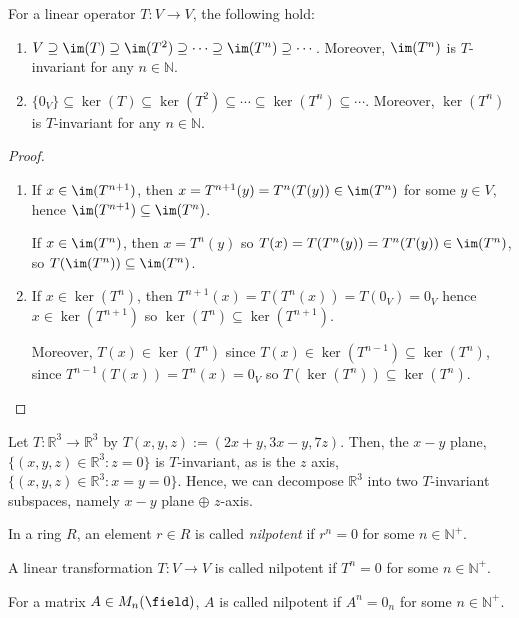 \begin{proposition}
    For a linear operator $T : V \to V$, the following hold:
    \begin{enumerate}
        \item $V \supseteq \im(T) \supseteq \im(T^2) \supseteq \cdots \supseteq \im(T^n) \supseteq  \cdots$. Moreover, $\im(T^n)$ is $T$-invariant for any $n \in \mathbb{N}$.
        \item $\{0_V\} \subseteq \ker(T) \subseteq \ker(T^2) \subseteq \cdots \subseteq \ker(T^n) \subseteq \cdots$. Moreover, $\ker(T^n)$ is $T$-invariant for any $n \in \mathbb{N}$.
    \end{enumerate}
\end{proposition}

\begin{proof}
    \begin{enumerate}
        \item If $x \in \im(T^{n+1})$, then $x = T^{n+1}(y) = T^{n}(T(y)) \in \im(T^n)$ for some $y \in V$, hence $\im(T^{n+1}) \subseteq \im(T^{n})$.
        
         If $x \in \im(T^n)$, then $x = T^{n}(y)$ so $T(x) = T(T^{n}(y)) = T^{n}(T(y)) \in \im (T^n)$, so $T(\im(T^n)) \subseteq \im(T^n)$.

         \item If $x \in \ker(T^n)$, then $T^{n+1}(x) = T(T^n(x)) = T(0_V) = 0_V$ hence $x \in \ker(T^{n+1})$ so $\ker(T^{n}) \subseteq \ker(T^{n+1})$.
         
         Moreover, $T(x) \in \ker(T^n)$ since $T(x) \in \ker (T^{n-1}) \subseteq \ker(T^n)$, since $T^{n-1}(T(x)) = T^{n}(x) = 0_V$ so $T(\ker(T^n)) \subseteq \ker(T^{n})$.
    \end{enumerate}
\end{proof}

\begin{example}
    Let $T: \mathbb{R}^3 \to \mathbb{R}^3$ by $T(x, y, z) := (2x +y, 3x - y, 7z)$. Then, the $x-y$ plane, $\{(x, y, z) \in \mathbb{R}^3: z = 0\}$ is $T$-invariant, as is the $z$ axis, $\{(x, y, z)\in\mathbb{R}^3: x = y = 0\}$. Hence, we can decompose $\mathbb{R}^3$ into two $T$-invariant subspaces, namely $x-y$ plane $\oplus$ $z$-axis.
\end{example}

\begin{definition}[Nilpotent]
    In a ring $R$, an element $r \in R$ is called \emph{nilpotent} if $r^n = 0$ for some $n \in \mathbb{N}^+$. 
    
    A linear transformation $T: V \to V$ is called nilpotent if $T^n = 0$ for some $n \in \mathbb{N}^+$.\footnotemark

    For a matrix $A \in M_n(\field)$, $A$ is called nilpotent if $A^n = 0_n$ for some $n \in \mathbb{N}^+$.
\end{definition}

